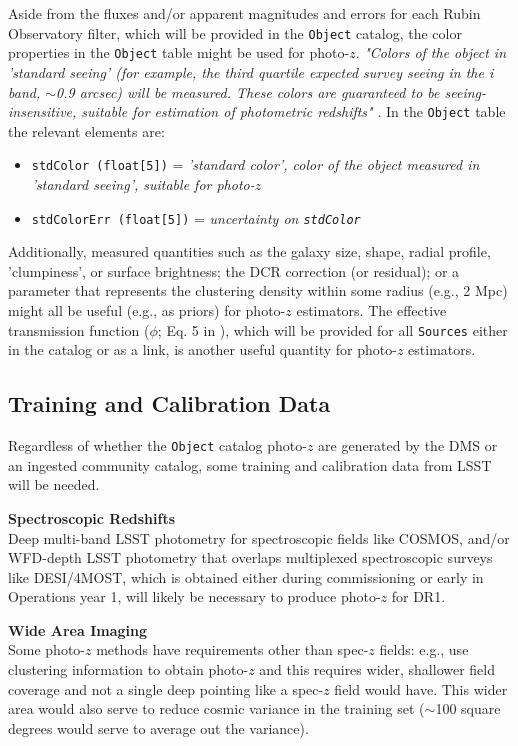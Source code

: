 \documentclass[DM,lsstdraft,toc]{lsstdoc}
\begin{document}
Aside from the fluxes and/or apparent magnitudes and errors for each Rubin Observatory filter, which will be provided in the {\tt Object} catalog, the color properties in the {\tt Object} table might be used for photo-$z$. {\it "Colors of the object in 'standard seeing' (for example, the third quartile expected survey seeing in the i band, $\sim$0.9 arcsec) will be measured. These colors are guaranteed to be seeing-insensitive, suitable for estimation of photometric redshifts"} . In the {\tt Object} table the relevant elements are:
\vspace{-15pt}
\begin{itemize}
\item \texttt{stdColor (float[5])} = {\it 'standard color', color of the object measured in 'standard seeing', suitable for photo-$z$}
\item \texttt{stdColorErr (float[5])} = {\it uncertainty on \texttt{stdColor}}
\end{itemize}

Additionally, measured quantities such as the galaxy size, shape, radial profile, 'clumpiness', or surface brightness; the DCR correction (or residual); or a parameter that represents the clustering density within some radius (e.g., 2 Mpc) might all be useful (e.g., as priors) for photo-$z$ estimators. The effective transmission function ($\phi$; Eq. 5 in ), which will be provided for all {\tt Sources} either in the catalog or as a link, is another useful quantity for photo-$z$ estimators.


\subsection{Training and Calibration Data}\label{ssec:dp_calib}

Regardless of whether the {\tt Object} catalog photo-$z$ are generated by the DMS or an ingested community catalog, some training and calibration data from LSST will be needed.

{\bf Spectroscopic Redshifts}\\
Deep multi-band LSST photometry for spectroscopic fields like COSMOS, and/or WFD-depth LSST photometry that overlaps multiplexed spectroscopic surveys like DESI/4MOST, which is obtained either during commissioning or early in Operations year 1, will likely be necessary to produce photo-$z$ for DR1.

{\bf Wide Area Imaging}\\
Some photo-$z$ methods have requirements other than spec-$z$ fields: e.g., \citet{2019MNRAS.483.2801S} use clustering information to obtain photo-$z$ and this requires wider, shallower field coverage and not a single deep pointing like a spec-$z$ field would have. 
This wider area would also serve to reduce cosmic variance in the training set ($\sim$100 square degrees would serve to average out the variance).
\end{document}
